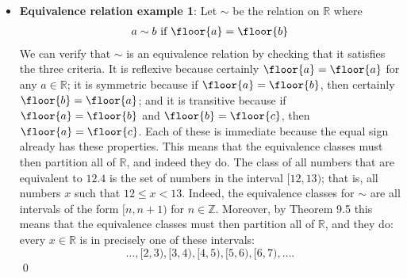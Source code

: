 \documentclass{report}
\begin{document}
\begin{itemize}
            \[
                a \sim b \quad \text{and} \quad a \sim x.
            \]
            By the symmetry property of \( \sim \),
            \[
                b \sim a \quad \text{and} \quad a \sim x.
            \]
            By the transitivity property of \( \sim \),
            \[
                b \sim x.
            \]
            And so, by Notation 9.9,
            \[
                x \in [b].
            \]
            We have shown that \( x \in [a] \) implies \( x \in [b] \), and hence \([a] \subseteq [b]\).
            \bigbreak \noindent 
            The reverse direction is nearly the same. Let \( x \in [b] \), which means \( b \sim x \). Combining this, the transitivity of \( \sim \), and our assumption that \( a \sim b \), we get \( a \sim x \), which means \( x \in [a] \). And since \( x \in [b] \) implies \( x \in [a] \), we have \([b] \subseteq [a]\).
            \bigbreak \noindent 
            We have shown that \([a] \subseteq [b]\) and \([b] \subseteq [a]\), which proves that \([a] = [b]\). This concludes the backward direction, and hence the proof.
            \qed
            \bigbreak \noindent 
            We now proceed to the proof of theorem 9.5

        \item \textbf{Equivalence relation example 1}: Let $\sim$ be the relation on $\mathbb{R}$ where
            \begin{align*}
                a \sim b \text{ if } \floor{a} = \floor{b}
            \end{align*}
            We can verify that \( \sim \) is an equivalence relation by checking that it satisfies the three criteria. It is reflexive because certainly \( \floor{a}= \floor{a} \) for any \( a \in \mathbb{R} \); it is symmetric because if \( \floor{a} = \floor{b} \), then certainly \( \floor{b} = \floor{a} \); and it is transitive because if \( \floor{a} = \floor{b} \) and \( \floor{b} = \floor{c} \), then \( \floor{a} = \floor{c} \). Each of these is immediate because the equal sign already has these properties.
            \bigbreak \noindent 
            This means that the equivalence classes must then partition all of $\mathbb{R}$, and indeed they do.
            The class of all numbers that are equivalent to \( 12.4 \) is the set of numbers in the interval \([12, 13)\); that is, all numbers \( x \) such that \( 12 \leq x < 13 \). Indeed, the equivalence classes for \( \sim \) are all intervals of the form \([n, n+1)\) for \( n \in \mathbb{Z} \). 
            \bigbreak \noindent 
            Moreover, by Theorem 9.5 this means that the equivalence classes must then partition all of \( \mathbb{R} \), and they do: every \( x \in \mathbb{R} \) is in precisely one of these intervals:
            \[
                \ldots, [2, 3), [3, 4), [4, 5), [5, 6), [6, 7), \ldots.
            \]
            \qed
    \end{itemize}
\end{document}
